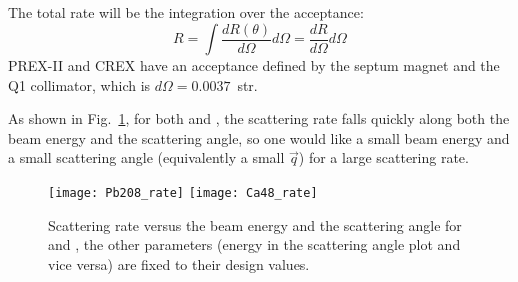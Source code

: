 The total rate will be the integration over the acceptance:
\begin{equation}
    R = \int \frac{dR(\theta)}{d\Omega} d\Omega = \frac{dR}{d\Omega} d\Omega
\end{equation}
PREX-II and CREX have an acceptance defined by the septum magnet and the Q1 collimator, 
which is $d\Omega = 0.0037$~str.

\begin{comment}
Finally, we should also consider radiative correction due to emission of virtual
and real soft photons (Bremsstrahlung radiation), and hard photons by vacuum polarization,
this correction is formulated as:
\begin{equation}
    \eta = \left(\frac{\Delta}{E} \right)^{bt}
\end{equation}
which is evaluated to be: $\eta \sim 0.5$.
\end{comment}

As shown in Fig.~\ref{fig:scattering_rate}, for both \Pb and \Ca, the scattering 
rate falls quickly along both the beam energy and the scattering angle, 
so one would like a small beam energy and a small scattering angle (equivalently
a small $\vec{q}$) for a large scattering rate.
\begin{figure}[!h]
    \texttt{[image: Pb208\_rate]}
    \texttt{[image: Ca48\_rate]}
    \caption{Scattering rate versus the beam energy and the scattering angle for \Pb and \Ca,
    the other parameters (energy in the scattering angle plot and vice versa) 
    are fixed to their design values.}
    \label{fig:scattering_rate}
\end{figure}

